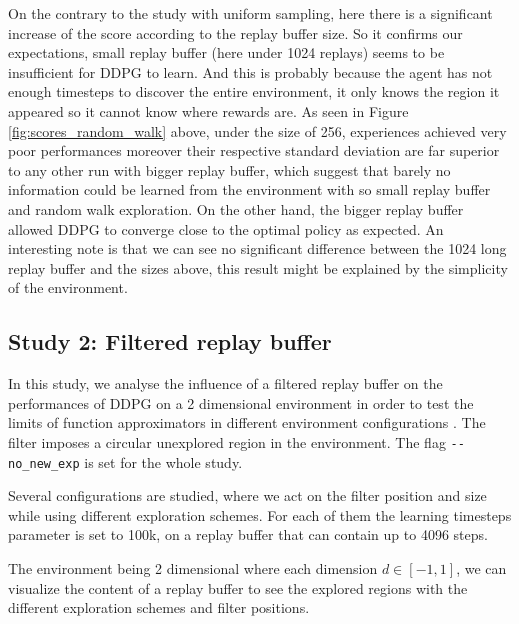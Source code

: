 \documentclass{article}
\begin{document}
On the contrary to the study with uniform sampling, here there is a significant increase of the score according to the replay buffer size. So it confirms our expectations, small replay buffer (here under 1024 replays) seems to be insufficient for DDPG to learn. And this is probably because the agent has not enough timesteps to discover the entire environment, it only knows the region it appeared so it cannot know where rewards are. As seen in Figure \ref{fig:scores_random_walk} above, under the size of 256, experiences achieved very poor performances moreover their respective standard deviation are far superior to any other run with bigger replay buffer, which suggest that barely no information could be learned from the environment with so small replay buffer and random walk exploration. On the other hand, the bigger replay buffer allowed DDPG to converge close to the optimal policy as expected. An interesting note is that we can see no significant difference between the 1024 long replay buffer and the sizes above, this result might be explained by the simplicity of the environment.


\subsection{Study 2: Filtered replay buffer}

In this study, we analyse the influence of a filtered replay buffer on the performances of DDPG on a 2 dimensional environment in order to test the limits of function approximators  in different environment configurations \cite{schaul_universal_2015}. The filter imposes a circular unexplored region in the environment. The flag \lstinline|--no_new_exp| is set for the whole study.

Several configurations are studied, where we act on the filter position and size while using different exploration schemes. For each of them the learning timesteps parameter is set to 100k, on a replay buffer that can contain up to 4096 steps.

The environment being 2 dimensional where each dimension $d\in[-1,1]$, we can visualize the content of a replay buffer to see the explored regions with the different exploration schemes and filter positions.
\end{document}
